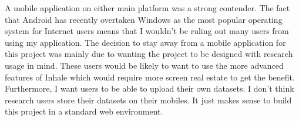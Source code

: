 A mobile application on either main platform was a strong contender. The fact that Android has recently overtaken Windows as the most popular operating system for Internet users \cite{android} means that I wouldn't be ruling out many users from using my application. The decision to stay away from a mobile application for this project was mainly due to wanting the project to be designed with research usage in mind. These users would be likely to want to use the more advanced features of Inhale which would require more screen real estate to get the benefit. Furthermore, I want users to be able to upload their own datasets. I don't think research users store their datasets on their mobiles. It just makes sense to build this project in a standard web environment.\\
